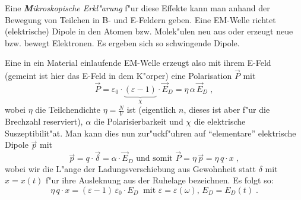 \documentclass[twoside,a4paper]{book}
\newcommand{\st}[1]{{\slshape \textbf #1}}
\newcommand{\abs}[0]{\bigskip \noindent}
\begin{document}
\abs 
Eine \st{Mikroskopische Erkl"arung} f"ur diese Effekte kann man
anhand der Bewegung von Teilchen in B- und E-Feldern geben. Eine
EM-Welle richtet (elektrische) Dipole in den Atomen bzw. Molek"ulen
neu aus oder erzeugt neue bzw. bewegt Elektronen. Es ergeben sich so
schwingende Dipole.

Eine in ein Material einlaufende EM-Welle erzeugt also mit ihrem
E-Feld (gemeint ist hier das E-Feld in dem K"orper) eine Polarisation
$\vec P$ mit
\begin{equation*}
   \vec P = \varepsilon_0 \cdot \underbrace{(\varepsilon - 1)}_{\chi}
   \cdot \vec E_D = \eta \, \alpha \, \vec E_D \;,
\end{equation*}
wobei $\eta$ die Teilchendichte $\eta = \frac{N}{V}$ ist (eigentlich
$n$, dieses ist aber f"ur die Brechzahl reserviert), $\alpha$ die
Polarisierbarkeit und $\chi$ die elektrische
Suszeptibilit"at. Man kann dies nun
zur"uckf"uhren auf "`elementare"' elektrische Dipole $\vec p$ mit
\begin{equation*}
   \vec p = q \cdot \vec\delta = \alpha \cdot \vec E_D \text{ und somit }
\vec P = \eta \, \vec p = \eta \, q \cdot x \;,
\end{equation*}
wobei wir die L"ange der Ladungsverschiebung aus Gewohnheit statt
$\delta$ mit $x = x(t)$ f"ur ihre Ausleknung aus der Ruhelage
bezeichnen.  Es folgt so:
\begin{equation}
   \label{eq:24}
   \eta \, q \cdot x = (\varepsilon - 1) \, \varepsilon_0 \cdot E_D ~ 
   \text{ mit } \varepsilon = \varepsilon(\omega), \, E_D = E_D(t) \;.
\end{equation}
\end{document}
